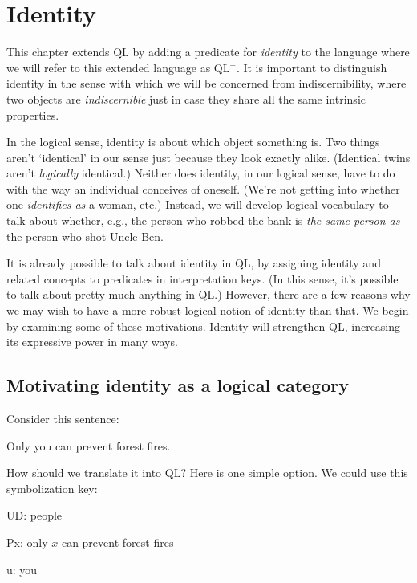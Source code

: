 ﻿%
\chapter{Identity}
\label{ch.identity}

This chapter extends QL by adding a predicate for \emph{identity} to the language where we will refer to this extended language as QL$^=$.
It is important to distinguish identity in the sense with which we will be concerned from indiscernibility, where two objects are \textit{indiscernible} just in case they share all the same intrinsic properties.


In the logical sense, identity is about which object something is. Two things aren't `identical' in our sense just because they look exactly alike. (Identical twins aren't \emph{logically} identical.) Neither does identity, in our logical sense, have to do with the way an individual conceives of oneself. (We're not getting into whether one \emph{identifies as} a woman, etc.) Instead, we will develop logical vocabulary to talk about whether, e.g., the person who robbed the bank is \emph{the same person as} the person who shot Uncle Ben.

It is already possible to talk about identity in QL, by assigning identity and related concepts to predicates in interpretation keys. (In this sense, it's possible to talk about pretty much anything in QL.) However, there are a few reasons why we may wish to have a more robust logical notion of identity than that. We begin by examining some of these motivations. Identity will strengthen QL, increasing its expressive power in many ways.

\section{Motivating identity as a logical category}
\label{sec.identitymotivation}

Consider this sentence:

\begin{earg}
\item[\ex{onlyyou}] Only you can prevent forest fires.
\end{earg}

How should we translate it into QL? Here is one simple option. We could use this symbolization key:

\begin{ekey}
\item[UD:] people
\item[Px:] only $x$ can prevent forest fires
\item[u:] you
\end{ekey}

